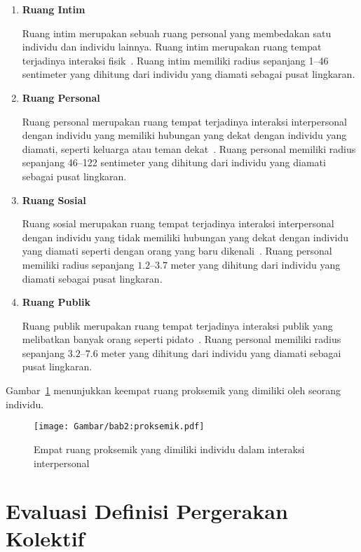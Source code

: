 \begin{enumerate}
    \item \textbf{Ruang Intim}
    
    Ruang intim merupakan sebuah ruang personal yang membedakan satu individu dan individu lainnya. Ruang intim merupakan ruang tempat terjadinya interaksi fisik~\cite{hall:06:proxemic}. Ruang intim memiliki radius sepanjang 1--46 sentimeter yang dihitung dari individu yang diamati sebagai pusat lingkaran. 
    
    \item \textbf{Ruang Personal}
    
    Ruang personal merupakan ruang tempat terjadinya interaksi interpersonal dengan individu yang memiliki hubungan yang dekat dengan individu yang diamati, seperti keluarga atau teman dekat~\cite{hall:06:proxemic}. Ruang personal memiliki radius sepanjang 46--122 sentimeter yang dihitung dari individu yang diamati  sebagai pusat lingkaran. 
    
    \item \textbf{Ruang Sosial}
    
    Ruang sosial merupakan ruang tempat terjadinya interaksi interpersonal dengan individu yang tidak memiliki hubungan yang dekat dengan individu yang diamati seperti dengan orang yang baru dikenali~\cite{hall:06:proxemic}. Ruang personal memiliki radius sepanjang $1.2$--$3.7$ meter yang dihitung dari individu yang diamati sebagai pusat lingkaran. 
    
    \item \textbf{Ruang Publik}
    
    Ruang publik merupakan ruang tempat terjadinya interaksi publik yang melibatkan banyak orang seperti pidato~\cite{hall:06:proxemic}. Ruang personal memiliki radius sepanjang $3.2$--$7.6$ meter yang dihitung dari individu yang diamati sebagai pusat lingkaran. 
\end{enumerate}

Gambar~\ref{bab2:proksemik} menunjukkan keempat ruang proksemik yang dimiliki oleh seorang individu.

\begin{figure}[htbp]
    \centering
    \texttt{[image: Gambar/bab2:proksemik.pdf]}
    \caption{Empat ruang proksemik yang dimiliki individu dalam interaksi interpersonal}
    \label{bab2:proksemik}
\end{figure}

\section{Evaluasi Definisi Pergerakan Kolektif}
\label{sec:eval-theory}

